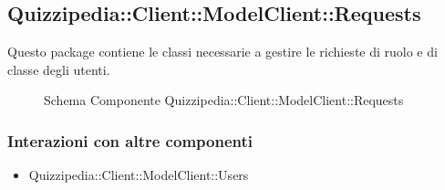 \subsection{Quizzipedia::Client::ModelClient::Requests}
Questo package contiene le classi necessarie a gestire le richieste di ruolo e di classe degli utenti.
\begin{figure}[H]
\centering
\noindent{}
\caption[Schema Componente Quizzipedia::Client::ModelClient::Requests]{Schema Componente Quizzipedia::Client::ModelClient::Requests}
\end{figure}
\subsubsection{Interazioni con altre componenti}
\begin{itemize}
\item Quizzipedia::Client::ModelClient::Users
\end{itemize}
